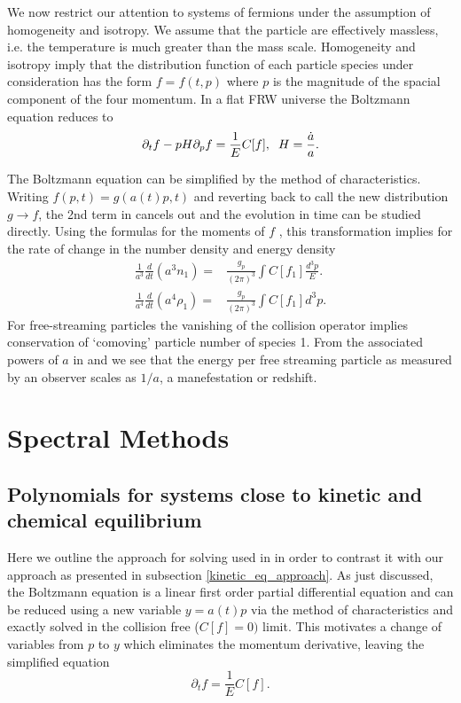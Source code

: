 We now restrict our attention to  systems of fermions under the assumption of homogeneity and isotropy. We assume that the particle are effectively massless,  i.e. the temperature is much greater than the mass scale.  Homogeneity and isotropy imply that the distribution function of each particle species under consideration has the form $f=f(t,p)$ where $p$ is the magnitude of the spacial component of the four momentum.  In a flat FRW universe the Boltzmann equation reduces to
\begin{equation}\label{boltzmann_p}
\partial_t f-pH \partial_p f=\frac{1}{E}C[f],\hspace{2mm} H=\frac{\dot{a}}{a}.
\end{equation}

The Boltzmann equation  can be simplified by the method of characteristics. Writing $f(p, t)=g(a(t)p,t)$ and reverting back to call the new distribution $g\to f$, the 2nd term in  cancels out and the evolution in time can be studied directly.  Using the formulas for the moments of $f$ , this transformation implies for the rate of change in the   number density and energy density  
\begin{align}\label{n_div}
\frac{1}{a^3}\frac{d}{dt}(a^3n_1)=&\frac{g_p}{(2\pi)^3}\int C[f_1] \frac{d^3p}{E}.\\
\label{rho_div}
\frac{1}{a^4}\frac{d}{dt}(a^4\rho_1)=&\frac{g_p}{(2\pi)^3}\int C[f_1] d^3p .
\end{align} 
For free-streaming particles the vanishing of the collision operator implies conservation of `comoving' particle number of species 1. From the associated powers of $a$ in  and  we see that the energy per free streaming particle as measured by an observer scales as $1/a$, a manefestation or redshift.

\section{Spectral Methods}\label{the_method}
\subsection{Polynomials for systems close to kinetic and chemical equilibrium}\label{free_stream_approach}
Here we outline the approach for solving  used in \cite{Esposito2000,Mangano2002} in order to contrast it with our approach as presented in subsection \ref{kinetic_eq_approach}.  As just discussed, the Boltzmann equation  is a linear first order partial differential equation and can be reduced using a new variable $y=a(t)p$  via the method of characteristics and exactly solved in the collision free ($C[f]=0)$ limit.   This motivates a change of variables from $p$ to $y$ which eliminates the momentum derivative, leaving the simplified equation
\begin{equation}\label{a_vars}
\partial_tf=\frac{1}{E} C[f].
\end{equation}

